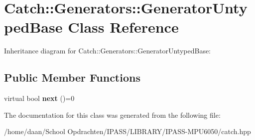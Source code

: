\hypertarget{classCatch_1_1Generators_1_1GeneratorUntypedBase}{}\section{Catch\+:\+:Generators\+:\+:Generator\+Untyped\+Base Class Reference}
\label{classCatch_1_1Generators_1_1GeneratorUntypedBase}


Inheritance diagram for Catch\+:\+:Generators\+:\+:Generator\+Untyped\+Base\+:
\subsection*{Public Member Functions}
\begin{DoxyCompactItemize}
\item 
\mbox{\label{classCatch_1_1Generators_1_1GeneratorUntypedBase_aeed3c0cd6233c5f553549e453b8d6638}} 
virtual bool {\bfseries next} ()=0
\end{DoxyCompactItemize}


The documentation for this class was generated from the following file\+:\begin{DoxyCompactItemize}
\item 
/home/daan/\+School Opdrachten/\+I\+P\+A\+S\+S/\+L\+I\+B\+R\+A\+R\+Y/\+I\+P\+A\+S\+S-\/\+M\+P\+U6050/catch.\+hpp\end{DoxyCompactItemize}
